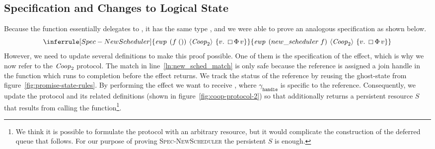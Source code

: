 \subsection{Specification and Changes to Logical State}
Because the function essentially delegates to , it has the same type , and we were able to prove an analogous specification as shown below.
\[
  \inferrule[Spec-NewScheduler]
  {\ewp{f\; ()}{\proto{2}}{v.\; \always \Phi\, v}}
  {\ewp{new\_scheduler\; f}{\proto{2}}{v.\; \always \Phi\, v}}
\]
%
However, we need to update several definitions to make this proof possible.
One of them is the specification of the \esuspend{} effect, which is why we now refer to the \(\mathit{Coop}_{2}\) protocol.
The match in line~\ref{ln:new_sched_match} is only safe because the reference is assigned a join handle in the  function which runs to completion before the effect returns.
We track the status of the reference by reusing the \gsOneShotAssign{} ghost-state from figure~\ref{fig:promise-state-rules}.
By performing the \esuspend{} effect we want to receive , where \(\gamma_{{\scriptscriptstyle \mathtt{handle}}}\) is specific to the  reference.
Consequently, we update the protocol and its related definitions (shown in figure~\ref{fig:coop-protocol-2}) so that \esuspend{} additionally returns a persistent resource
\(S\) that results from calling the  function\footnote{We think it is possible to formulate the protocol with an arbitrary resource, but it would complicate the construction of the deferred queue that follows. For our purpose of proving \textsc{Spec-NewScheduler} the persistent \(S\) is enough.}.

